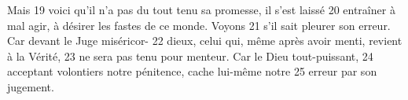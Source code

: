 Mais	 
19	 	voici qu'il n'a pas du tout tenu sa promesse, il s'est laissé	 
20	 	entraîner à mal agir, à désirer les fastes de ce monde. Voyons	 
21	 	s'il sait pleurer son erreur. Car devant le Juge miséricor-	 
22	 	dieux, celui qui, même après avoir menti, revient à la Vérité,	 
23	 	ne sera pas tenu pour menteur. Car le Dieu tout-puissant,	 
24	 	acceptant volontiers notre pénitence, cache lui-même notre	 
25	 	erreur par son jugement.